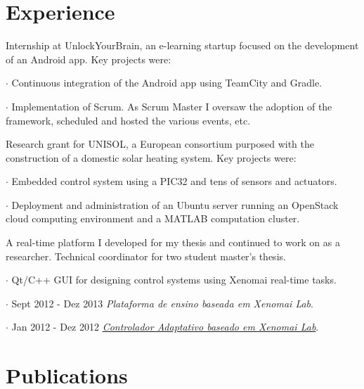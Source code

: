 \section*{Experience}

{
Internship at UnlockYourBrain, an e-learning startup focused on the development
of an Android app. Key projects were:

$\cdot$  Continuous integration of the Android app using TeamCity and Gradle.

$\cdot$  Implementation of Scrum. As Scrum Master I oversaw the
adoption of the framework, scheduled and hosted  the various events, etc.

}

\vspace{\baselineskip}
{
Research grant for UNISOL, a European consortium purposed with the construction
of a domestic solar heating system. Key projects were:

$\cdot$  Embedded control system using a PIC32 and tens of sensors and
actuators.

$\cdot$  Deployment and administration of an Ubuntu server running an
OpenStack cloud computing environment and a MATLAB computation cluster.
}

\vspace{\baselineskip}
{
A real-time platform I developed for my thesis and continued to work on as a
researcher. Technical coordinator for two student master's thesis.

$\cdot$  Qt/C++ GUI for designing control systems using Xenomai real-time tasks.

$\cdot$ Sept 2012 - Dez 2013 \emph{Plataforma de ensino baseada em Xenomai Lab}.

$\cdot$ Jan 2012 - Dez 2012 \href{http://ria.ua.pt/handle/10773/10933}{\emph{Controlador Adaptativo baseado em Xenomai Lab}}.
}

\section*{Publications}

